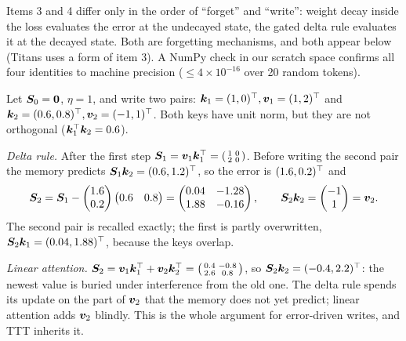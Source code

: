 Items 3 and 4 differ only in the order of ``forget'' and ``write'': weight decay inside the
loss evaluates the error at the undecayed state, the gated delta rule evaluates it at the
decayed state. Both are forgetting mechanisms, and both appear below (Titans uses a form of
item 3). A NumPy check in our scratch space confirms all four identities to machine precision
($\le 4\times10^{-16}$ over 20 random tokens).

\begin{example}[Delta rule versus linear attention with $d_k = d_v = 2$]\label{ex:c09-delta}
Let $\bm{S}_0 = \bm{0}$, $\eta = 1$, and write two pairs:
$\bm{k}_1 = (1, 0)^{\top}, \bm{v}_1 = (1, 2)^{\top}$ and $\bm{k}_2 = (0.6, 0.8)^{\top}, \bm{v}_2 = (-1, 1)^{\top}$.
Both keys have unit norm, but they are not orthogonal ($\bm{k}_1^{\top}\bm{k}_2 = 0.6$).

\emph{Delta rule.} After the first step $\bm{S}_1 = \bm{v}_1\bm{k}_1^{\top} =
\begin{psmallmatrix} 1 & 0 \\ 2 & 0 \end{psmallmatrix}$. Before writing the second pair the
memory predicts $\bm{S}_1\bm{k}_2 = (0.6, 1.2)^{\top}$, so the error is $(1.6, 0.2)^{\top}$ and
\[
  \bm{S}_2 = \bm{S}_1 - \begin{pmatrix} 1.6 \\ 0.2\end{pmatrix}\begin{pmatrix}0.6 & 0.8\end{pmatrix}
        = \begin{pmatrix} 0.04 & -1.28 \\ 1.88 & -0.16 \end{pmatrix}, \qquad
  \bm{S}_2\bm{k}_2 = \begin{pmatrix} -1 \\ 1 \end{pmatrix} = \bm{v}_2 .
\]
The second pair is recalled exactly; the first is partly overwritten,
$\bm{S}_2\bm{k}_1 = (0.04, 1.88)^{\top}$, because the keys overlap.

\emph{Linear attention.} $\bm{S}_2 = \bm{v}_1\bm{k}_1^{\top} + \bm{v}_2\bm{k}_2^{\top} =
\begin{psmallmatrix} 0.4 & -0.8 \\ 2.6 & 0.8 \end{psmallmatrix}$, so
$\bm{S}_2\bm{k}_2 = (-0.4, 2.2)^{\top}$: the newest value is buried under interference from the old one.
The delta rule spends its update on the part of $\bm{v}_2$ that the memory does not yet predict;
linear attention adds $\bm{v}_2$ blindly. This is the whole argument for error-driven writes, and
TTT inherits it.
\end{example}

